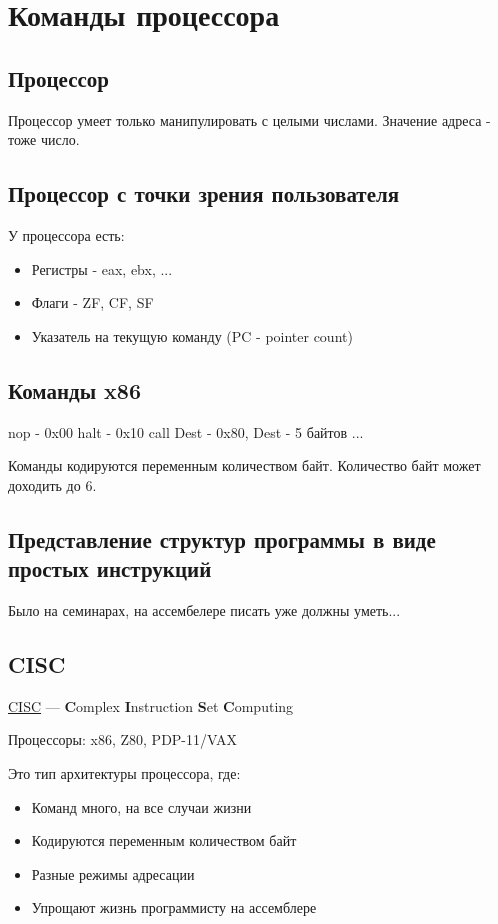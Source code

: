 \section{Команды процессора}

\subsection{Процессор}

Процессор умеет только манипулировать с целыми числами. Значение адреса - тоже число.

\subsection{Процессор с точки зрения пользователя}

У процессора есть:
\begin{itemize}
	\item Регистры - eax, ebx, ...
	\item Флаги - ZF, CF, SF
	\item Указатель на текущую команду (PC - pointer count)
\end{itemize}

\subsection{Команды x86}

nop - 0x00
halt - 0x10
call Dest - 0x80, Dest - 5 байтов
...

Команды кодируются переменным количеством байт. Количество байт может доходить до 6.

\subsection{Представление структур программы в виде простых инструкций}

Было на семинарах, на ассембелере писать уже должны уметь...

\subsection{CISC}

\begin{Def}
	\underline{CISC} --- \textbf{C}omplex \textbf{I}nstruction \textbf{S}et \textbf{C}omputing
\end{Def}

Процессоры: x86, Z80, PDP-11/VAX

Это тип архитектуры процессора, где:
\begin{itemize}
	\item Команд много, на все случаи жизни
	\item Кодируются переменным количеством байт
	\item Разные режимы адресации
	\item Упрощают жизнь программисту на ассемблере
\end{itemize}

